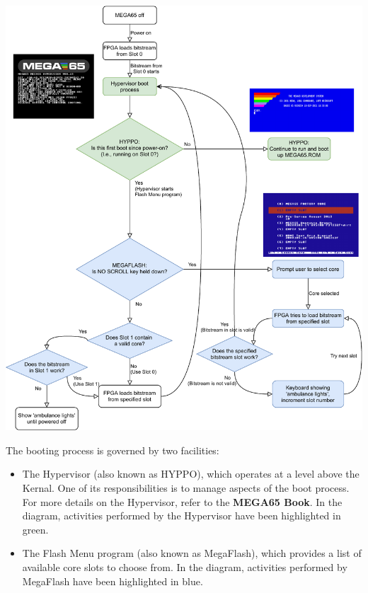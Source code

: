 \includegraphics[width=\linewidth]{images/illustrations/flashmenu-flowchart.pdf}

The booting process is governed by two facilities:
\begin{itemize}
  \item The Hypervisor (also known as HYPPO), which operates at a level above the Kernal. One of its responsibilities is to manage aspects of the boot process. For more details on the Hypervisor, refer to the {\bf MEGA65 Book}. In the diagram, activities performed by the Hypervisor have been highlighted in green.
  \item The Flash Menu program (also known as MegaFlash), which provides a list of available core slots to choose from. In the diagram, activities performed by MegaFlash have been highlighted in blue.
\end{itemize}

